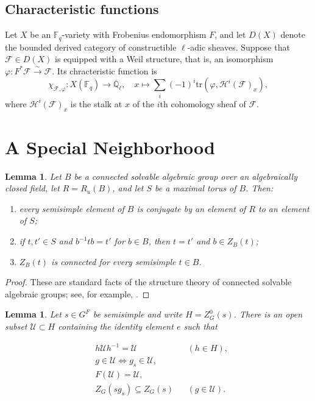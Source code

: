 \documentclass[11pt,letterpaper]{amsart}
\newcommand{\ov}{\overline}
\newtheorem{lemma}[theorem]{Lemma}
\theoremstyle{definition}
\numberwithin{equation}{section}
\numberwithin{theorem}{section}
\begin{document}
\subsection{Characteristic functions}
Let $X$ be an $\mathbb{F}_q$-variety with Frobenius endomorphism $F$,
and let $D(X)$ denote the bounded derived category of constructible
$\ell$-adic sheaves.  Suppose that $\mathcal F\in D(X)$ is equipped with
a Weil structure, that is, an isomorphism
$\varphi:F^*\mathcal F\xrightarrow{\sim}\mathcal F$.  Its
chracteristic function is
\[\chi_{\mathcal{F}, \varphi}: X(\mathbb{F}_q) \to \ov{\mathbb{Q}}_\ell, \quad x \mapsto \sum_i (-1)^i \mathrm{tr}(\varphi, \mathcal{H}^i(\mathcal{F})_x),\]
where $\mathcal{H}^i(\mathcal{F})_x$ is the stalk at $x$ of the $i$th
cohomology sheaf of $\mathcal{F}$.


\section{A Special Neighborhood}\label{sp}



\begin{lemma}\label{solv}
Let \(B\) be a connected solvable algebraic group over an
algebraically closed field, let \(R=R_u(B)\), and let \(S\) be a maximal
torus of \(B\). Then:

\begin{enumerate}
\item every semisimple element of \(B\) is conjugate by an element of \(R\) to
an element of \(S\);
\item if \(t,t'\in S\) and \(b^{-1}tb=t'\) for \(b\in B\), then \(t=t'\) and
\(b\in Z_B(t)\);
\item \(Z_B(t)\) is connected for every semisimple \(t\in B\).
\end{enumerate}
\end{lemma}

\begin{proof}

These are standard facts of the structure theory of connected
solvable algebraic groups; see, for example, \cite{Borel_91}.
\end{proof}



\begin{lemma}\label{U}
Let $s\in G^F$ be semisimple and write $H=Z^0_{G}(s)$. There is an open
subset $\mathcal U\subset H$ containing the identity element $e$ such that

\[
\begin{aligned}
&h\mathcal U h^{-1}=\mathcal U &&(h\in H),\\
&g\in\mathcal U\Longleftrightarrow g_s\in\mathcal U,\\
&F(\mathcal U)=\mathcal U,\\
&Z_{G}(s g_s)\subseteq Z_{G}(s) &&(g\in\mathcal U).
\end{aligned}
\]
\end{lemma}
\end{document}
